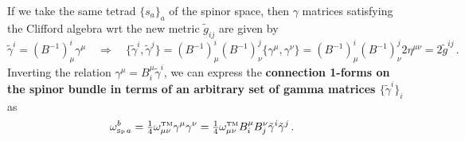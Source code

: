 \documentclass[../geometry_main.tex]{subfiles}
\begin{document}
\begin{mytheorem}
If we take the same tetrad $\{s_a\}_a$ of the spinor space, then $\gamma$ matrices satisfying the Clifford algebra wrt the new metric $\tilde{g}_{ij}$ are given by
\begin{equation}
    \tilde{\gamma}^i = (B^{-1})^i_\mu \gamma^\mu \quad \Rightarrow \quad \{\tilde{\gamma}^i, \tilde{\gamma}^j\} = (B^{-1})^i_\mu (B^{-1})^j_\nu \{\gamma^\mu, \gamma^\nu\} = (B^{-1})^i_\mu (B^{-1})^j_\nu 2 \eta^{\mu\nu} = 2 \tilde{g}^{ij}\,.
\end{equation}
Inverting the relation $\gamma^\mu = B^\mu_i \tilde{\gamma}^i$, we can express the \textbf{connection 1-forms on the spinor bundle in terms of an arbitrary set of gamma matrices $\{\tilde{\gamma}^i\}_i$} as
\begin{align}
    \omega^{b}_{{\text{\tiny Sp}}\, a}&= \tfrac14 \omega^{\text{\tiny TM}}_{\mu\nu} \gamma^\mu\gamma^\nu 
    = \tfrac14 \omega^{\text{\tiny TM}}_{\mu\nu} B^\mu_i B^\nu_j \tilde{\gamma}^i \tilde{\gamma}^j\,.  
\end{align}
\end{mytheorem}
\end{document}
